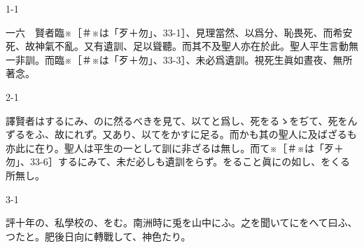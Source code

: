 \documentclass[tate,paper=b6j,jafontsize=9pt]{jlreq}
\begin{document}
\begin{azconvIndented}{1\zw}{-1\zw}

一六　賢者臨※{\small ［＃※は「歹＋勿」、33-1］}、見理當\azconvKunten{\azconvIR}然、以爲分、恥畏死、而希安死、故神氣不亂。又有遺訓、足以聳\azconvKunten{\azconvIR}聽。而其不及聖人亦在於此。聖人平生言動無一非\azconvKunten{\azconvIR}訓。而臨※{\small ［＃※は「歹＋勿」、33-3］}、未必爲遺訓。視死生眞如晝夜、無所著念。

\end{azconvIndented}
\begin{azconvIndented}{2\zw}{-1\zw}

譯賢者はするにみ、のに然るべきを見て、以てと爲し、死をるゝをぢて、死をんずるをふ、故にれず。又あり、以てをかすに足る。而かも其の聖人に及ばざるも亦此に在り。聖人は平生の一として訓に非ざるは無し。而て※{\small ［＃※は「歹＋勿」、33-6］}するにみて、未だ必しも遺訓をらず。をること眞にの如し、をくる所無し。

\end{azconvIndented}
\begin{azconvIndented}{3\zw}{-1\zw}

評十年の、私學校の、をむ。南洲時に兎を山中にふ。之を聞いてにをへて曰ふ、つたと。肥後日向に轉戰して、神色たり。

\end{azconvIndented}
\end{document}
